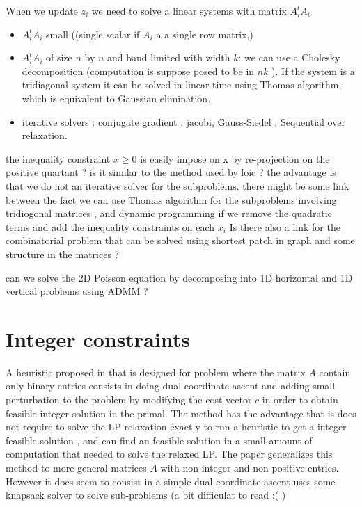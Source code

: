 \documentclass[11pt]{article}
\begin{document}
When we update $z_i$ we need to solve a linear systems with matrix $A_i^tA_i$
\begin{itemize}
\item 
$A_i^tA_i$ small ((single scalar if $A_i$ a a single row matrix,)
\item $A_i^tA_i$ of size $n$ by $n$ and band limited with width $k$: we can use a Cholesky decomposition (computation is suppose posed to be in $nk$ ). If the system is a  tridiagonal  system it can be solved in linear time using Thomas algorithm, which is equivalent to Gaussian elimination.

\item  iterative solvers : conjugate gradient , jacobi, Gauss-Siedel , Sequential over relaxation. 

 \end{itemize}
the inequality constraint $x\geq 0$ is easily impose on x by re-projection on the positive quartant ? 
is it similar to the method used by loic ? 
the advantage is that we do not an iterative solver for the subproblems.
there might be some link between the fact we can use Thomas algorithm for the subproblems involving tridiogonal matrices , and dynamic programming if we remove the quadratic terms and add the inequality  constraints on each $x_i$ 
Is there also a link for the combinatorial problem that can be solved using shortest patch in graph and some structure in the matrices  ? 

can we solve the 2D Poisson equation by decomposing into 1D horizontal and 1D vertical problems using ADMM ? 


\section{Integer constraints}

A heuristic proposed in \cite{Wedelin2013,Wedelin1995} that is designed for problem where the matrix $A$ contain only binary entries consists in doing dual coordinate ascent and adding small  perturbation to the problem  by modifying the cost vector $c$ in order to obtain feasible integer solution in the primal.
The method has the advantage that is does not require to solve the LP relaxation exactly to run a heuristic to get a integer feasible solution , and can find an feasible solution in a small amount of computation that needed to solve the relaxed LP. The paper \cite{Bastert2010} generalizes this method to more general matrices $A$ with non integer and non positive entries.
However it does seem to consist in a simple dual coordinate ascent uses some knapsack solver to solve sub-problems (a bit difficulat to read :( )


%



\end{document}
